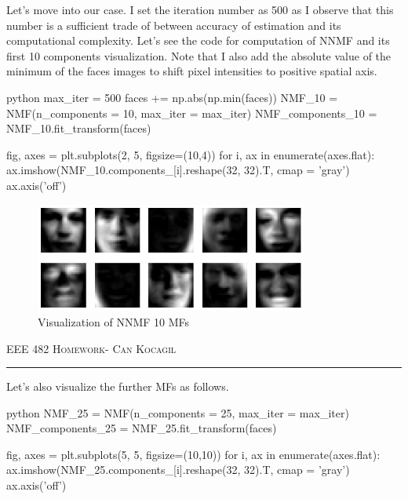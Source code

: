 \documentclass[12pt]{amsart}
\begin{document}
\bigskip
Let's move into our case. I set the iteration number as 500 as I observe that this number is a sufficient trade of between accuracy of estimation and its computational complexity. Let's see the code for computation of NNMF and its first 10 components visualization. Note that I also add the absolute value of the minimum of the faces images to shift pixel intensities to positive spatial axis.

\begin{mintedbox}{python}
max_iter = 500
faces += np.abs(np.min(faces))
NMF_10 = NMF(n_components = 10, max_iter = max_iter)
NMF_components_10 = NMF_10.fit_transform(faces)


fig, axes = plt.subplots(2, 5, figsize=(10,4))
for i, ax in enumerate(axes.flat):
    ax.imshow(NMF_10.components_[i].reshape(32, 32).T, cmap = 'gray')
    ax.axis('off')
\end{mintedbox}

\begin{figure}[h]
    \centering
        \includegraphics[width = 0.8\textwidth]{images/Q1/NMF_10_components.png}
        \caption{Visualization of NNMF 10 MFs}
\end{figure}


\newpage
{\scshape EEE 482} \hfill {\scshape \large  Homework-\relax} \hfill {\scshape Can Kocagil}
\smallskip
\hrule
\vspace{2mm}

Let's also visualize the further MFs as follows.

\begin{mintedbox}{python}
NMF_25 = NMF(n_components = 25, max_iter = max_iter)
NMF_components_25 = NMF_25.fit_transform(faces)


fig, axes = plt.subplots(5, 5, figsize=(10,10))
for i, ax in enumerate(axes.flat):
    ax.imshow(NMF_25.components_[i].reshape(32, 32).T, cmap = 'gray')
    ax.axis('off')
\end{mintedbox}
\end{document}
